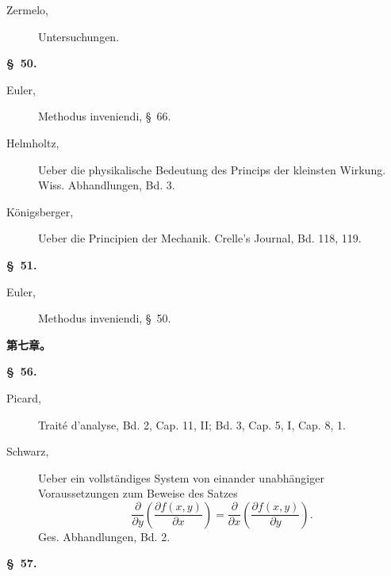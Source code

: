 \documentclass[11pt,a4paper,leqno]{article}
\begin{document}
\begin{description}
\item[Zermelo,] Untersuchungen.
\end{description}

\begin{center}{\bfseries \S~50.}\end{center}

\begin{description}
\item[Euler,] Methodus inveniendi, \S~66.

\item[Helmholtz,] Ueber die physikalische Bedeutung des Princips der kleinsten
Wirkung. Wiss. Abhandlungen, Bd. 3.

\item[Königsberger,] Ueber die Principien der Mechanik. Crelle's Journal,
Bd. 118, 119.
\end{description}

\begin{center}{\bfseries \S~51.}\end{center}

\begin{description}
\item[Euler,] Methodus inveniendi, \S~50.
\end{description}

\begin{center}
{\large\bfseries 第七章。}

{\bfseries \S~56.}
\end{center}

\begin{description}
\item[Picard,] Traité d'analyse, Bd. 2, Cap. 11, II; Bd. 3, Cap. 5, I,
Cap. 8, 1.

\item[Schwarz,] Ueber ein vollständiges System von einander unabhängiger
Voraussetzungen zum Beweise des Satzes
\[
\frac{\partial}{\partial y}\left(\frac{\partial f(x,y)}{\partial x}\right)
=\frac{\partial}{\partial x}\left(\frac{\partial f(x,y)}{\partial y}\right).
\]
Ges. Abhandlungen, Bd. 2.
\end{description}

\begin{center}{\bfseries \S~57.}\end{center}
\end{document}
